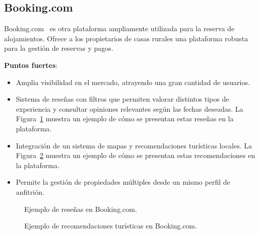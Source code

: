 \subsection{Booking.com}
Booking.com~\cite{booking} es otra plataforma ampliamente utilizada para la reserva de alojamientos. Ofrece a los propietarios de casas rurales una plataforma robusta para la gestión de reservas y pagos.

\textbf{Puntos fuertes}:
\begin{itemize}
    \item Amplia visibilidad en el mercado, atrayendo una gran cantidad de usuarios.
    \item Sistema de reseñas con filtros que permiten valorar distintos tipos de experiencia y consultar opiniones relevantes según las fechas deseadas. La Figura~\ref{fig:booking-reviews} muestra un ejemplo de cómo se presentan estas reseñas en la plataforma.
    \item Integración de un sistema de mapas y recomendaciones turísticas locales. La Figura~\ref{fig:booking-mapas} muestra un ejemplo de cómo se presentan estas recomendaciones en la plataforma.
    \item Permite la gestión de propiedades múltiples desde un mismo perfil de anfitrión.
\end{itemize}
\begin{figure}[h!tb]
    \centering
    \setlength{\fboxsep}{15pt}%
    \setlength{\fboxrule}{0.5pt}%
    \caption{Ejemplo de reseñas en Booking.com.}
    \label{fig:booking-reviews}
\end{figure}
\begin{figure}[h!tb]
    \centering
    \setlength{\fboxsep}{15pt}%
    \setlength{\fboxrule}{0.5pt}%
    \caption{Ejemplo de recomendaciones turísticas en Booking.com.}
    \label{fig:booking-mapas}
\end{figure}

